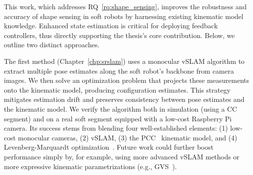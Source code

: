 
This work, which addresses \gls{RQ}~\ref{rq:shape_sensing}, improves the robustness and accuracy of shape sensing in soft robots by harnessing existing kinematic model knowledge. Enhanced state estimation is critical for deploying feedback controllers, thus directly supporting the thesis’s core contribution. Below, we outline two distinct approaches.

The first method (Chapter~\ref{chp:srslam}) uses a monocular \gls{vSLAM} algorithm to extract multiple pose estimates along the soft robot’s backbone from camera images. We then solve an optimization problem that projects these measurements onto the kinematic model, producing configuration estimates. This strategy mitigates estimation drift and preserves consistency between pose estimates and the kinematic model. We verify the algorithm both in simulation (using a \gls{CC} segment) and on a real soft segment equipped with a low-cost Raspberry Pi camera. Its success stems from blending four well-established elements: (1) low-cost monocular cameras, (2) \gls{vSLAM}, (3) the \gls{PCC}~\citep{webster2010design} kinematic model, and (4) Levenberg-Marquardt optimization~\citep{levenberg1944method, marquardt1963algorithm}. Future work could further boost performance simply by, for example, using more advanced \gls{vSLAM} methods or more expressive kinematic parametrizations (e.g., \gls{GVS}~\citep{renda2020geometric}).

